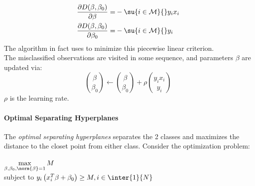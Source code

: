 \begin{align*}
	\dfrac{\partial D(\beta,\beta_{0})}{\partial\beta}=&-\su{{i\in\mathcal{M}}}{}y_{i}x_{i}\\
	\dfrac{\partial D(\beta,\beta_{0})}{\partial\beta_{0}}=&-\su{{i\in\mathcal{M}}}{}y_{i}\\
\end{align*}
The algorithm in fact uses  to minimize this piecewise 
linear criterion.\\
The misclassified observations are visited in some sequence, and parameters $\beta$ are updated
via:
$${{\beta}\choose{\beta_{0}}} \leftarrow {{\beta}\choose{\beta_{0}}}+\rho {{y_{i}x_{i}}\choose{y_{i}}}$$
$\rho$ is the learning rate.

\paragraph{Optimal Separating Hyperplanes}
The \textit{optimal separating hyperplanes} separates the 2 classes and maximizes the distance
to the closet point from  either class. Consider the optimization problem:
\begin{center}
$\max\limits_{\beta,\beta_{0},\norm{\beta}=1} M$\\
subject to $y_{i}\left(x_{i}^{T}\beta+\beta_{0}\right)\geq M, i\in\inter{1}{N}$
\end{center}
